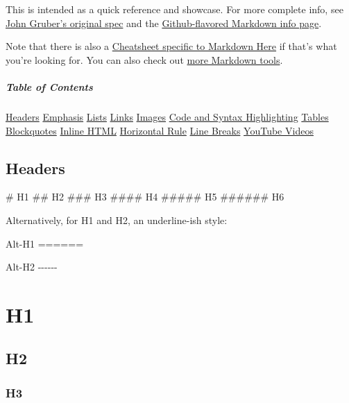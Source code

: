 \documentclass[
]{article}
\newenvironment{Shaded}{}{}
\newcommand{\FunctionTok}[1]{\textcolor[rgb]{0.02,0.16,0.49}{#1}}
\newcommand{\NormalTok}[1]{#1}
\begin{document}
This is intended as a quick reference and showcase. For more complete
info, see \href{http://daringfireball.net/projects/markdown/}{John
Gruber's original spec} and the
\href{http://github.github.com/github-flavored-markdown/}{Github-flavored
Markdown info page}.

Note that there is also a \href{./Markdown-Here-Cheatsheet}{Cheatsheet
specific to Markdown Here} if that's what you're looking for. You can
also check out \href{./Other-Markdown-Tools}{more Markdown tools}.

\subparagraph{Table of Contents}\label{table-of-contents}

\hyperref[headers]{Headers} \hyperref[emphasis]{Emphasis}
\hyperref[lists]{Lists} \hyperref[links]{Links}
\hyperref[images]{Images} \hyperref[code]{Code and Syntax Highlighting}
\hyperref[tables]{Tables} \hyperref[blockquotes]{Blockquotes}
\hyperref[html]{Inline HTML} \hyperref[hr]{Horizontal Rule}
\hyperref[lines]{Line Breaks} \hyperref[videos]{YouTube Videos}

\subsection{Headers}\label{headers}

\begin{Shaded}
\begin{Highlighting}[]
\FunctionTok{\# H1}
\FunctionTok{\#\# H2}
\FunctionTok{\#\#\# H3}
\FunctionTok{\#\#\#\# H4}
\FunctionTok{\#\#\#\#\# H5}
\FunctionTok{\#\#\#\#\#\# H6}

\NormalTok{Alternatively, for H1 and H2, an underline{-}ish style:}

\NormalTok{Alt{-}H1}
\FunctionTok{======}

\NormalTok{Alt{-}H2}
\NormalTok{{-}{-}{-}{-}{-}{-}}
\end{Highlighting}
\end{Shaded}

\section{H1}\label{h1}

\subsection{H2}\label{h2}

\subsubsection{H3}\label{h3}
\end{document}
